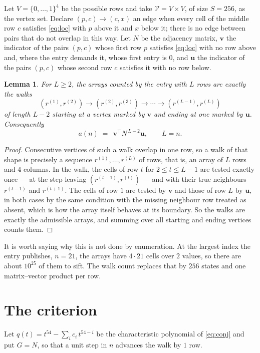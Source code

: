 \documentclass[11pt,a4paper]{article}
\theoremstyle{plain}
\newtheorem{lemma}[theorem]{Lemma}
\theoremstyle{definition}
\begin{document}
Let $V=\{0,\dots,1\}^{4}$ be the possible rows and take
$\mathcal V=V\times V$, of size $S=256$, as the vertex set. Declare $(p,c)\to(c,x)$ an edge
when every cell of the middle row $c$ satisfies \eqref{eq:loc} with $p$ above it and $x$
below it; there is no edge between pairs that do not overlap in this way. Let $N$ be the
adjacency matrix, $\mathbf{v}$ the indicator of the pairs $(p,c)$ whose first row $p$
satisfies \eqref{eq:loc} with no row above and, where the entry demands it, whose first entry is $0$, and $\mathbf{u}$ the indicator of
the pairs $(p,c)$ whose second row $c$ satisfies it with no row below.

\begin{lemma}\label{lem:walk}
For $L\ge2$, the arrays counted by the entry with $L$ rows are exactly the walks
\[
(r^{(1)},r^{(2)})\to(r^{(2)},r^{(3)})\to\cdots\to(r^{(L-1)},r^{(L)})
\]
of length $L-2$ starting at a vertex marked by $\mathbf{v}$ and ending at one marked by
$\mathbf{u}$. Consequently
\[
a(n)\;=\;\,\mathbf{v}^{\!\top}N^{\,L-2}\mathbf{u},\qquad L=n .
\]
\end{lemma}

\begin{proof}
Consecutive vertices of such a walk overlap in one row, so a walk of that shape is
precisely a sequence $r^{(1)},\dots,r^{(L)}$ of rows, that is, an array of $L$ rows
and $4$ columns. In the walk, the cells of row $t$ for $2\le t\le L-1$ are tested
exactly once --- at the step leaving $(r^{(t-1)},r^{(t)})$ --- and with their true
neighbours $r^{(t-1)}$ and $r^{(t+1)}$. The cells of row $1$ are tested by
$\mathbf{v}$ and those of row $L$ by $\mathbf{u}$, in both cases by the same condition
with the missing neighbour row treated as absent, which is how the array itself behaves at
its boundary. So the walks are exactly the admissible arrays, and summing over all starting
and ending vertices counts them.
\end{proof}


It is worth saying why this is not done by enumeration. At the largest index the entry
publishes, $n=21$, the arrays have $4\cdot21$ cells over
$2$ values, so there are about $10^{25}$ of them to sift. The
walk count replaces that by $256$ states and one matrix--vector product per row.
\section{The criterion}

Let $q(t)=t^{54}-\sum_i c_i\,t^{54-i}$ be the characteristic polynomial of
\eqref{eq:conj} and put $G=N$, so that a unit step in $n$ advances the walk by
$1$ row.
\end{document}
